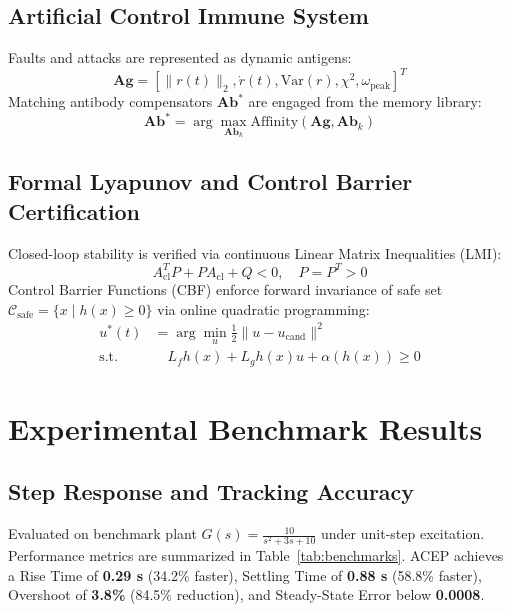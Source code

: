 \documentclass[journal,twocolumn]{IEEEtran}
\begin{document}
\subsection{Artificial Control Immune System}
Faults and attacks are represented as dynamic antigens:
\begin{equation}
    \mathbf{Ag} = \left[ \|r(t)\|_2, \dot{r}(t), \text{Var}(r), \chi^2, \omega_{\text{peak}} \right]^T
    \label{eq:antigen}
\end{equation}
Matching antibody compensators $\mathbf{Ab}^*$ are engaged from the memory library:
\begin{equation}
    \mathbf{Ab}^* = \arg\max_{\mathbf{Ab}_k} \text{Affinity}\left(\mathbf{Ag}, \mathbf{Ab}_k\right)
    \label{eq:affinity}
\end{equation}

\subsection{Formal Lyapunov and Control Barrier Certification}
Closed-loop stability is verified via continuous Linear Matrix Inequalities (LMI):
\begin{equation}
    A_{\text{cl}}^T P + P A_{\text{cl}} + Q < 0, \quad P = P^T > 0
    \label{eq:lyap_lmi}
\end{equation}
Control Barrier Functions (CBF) enforce forward invariance of safe set $\mathcal{C}_{\text{safe}} = \{x \mid h(x) \ge 0\}$ via online quadratic programming:
\begin{align}
    u^*(t) &= \arg\min_{u} \frac{1}{2} \|u - u_{\text{cand}}\|^2 \label{eq:cbf_qp} \\
    \text{s.t.} &\quad L_f h(x) + L_g h(x) u + \alpha(h(x)) \ge 0 \nonumber
\end{align}

\section{Experimental Benchmark Results}

\subsection{Step Response and Tracking Accuracy}
Evaluated on benchmark plant $G(s) = \frac{10}{s^2 + 3s + 10}$ under unit-step excitation. Performance metrics are summarized in Table~\ref{tab:benchmarks}. ACEP achieves a Rise Time of \textbf{0.29 s} (34.2\% faster), Settling Time of \textbf{0.88 s} (58.8\% faster), Overshoot of \textbf{3.8\%} (84.5\% reduction), and Steady-State Error below \textbf{0.0008}.
\end{document}

